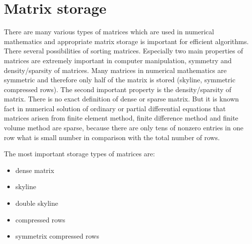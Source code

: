 \chapter{Matrix storage}
There are many various types of matrices which are used in numerical
mathematics and appropriate matrix storage is important for efficient
algorithms. There several possibilities of sorting matrices.
Especially two main properties of matrices are extremely important
in computer manipulation, symmetry and density/sparsity of matrices. Many
matrices in numerical mathematics are symmetric and therefore only
half of the matrix is stored (skyline, symmetric compressed rows).
The second important property is the density/sparsity of matrix. There is no
exact definition of dense or sparse matrix. But it is known fact in
numerical solution of ordinary or partial differential equations that
matrices arisen from finite element method, finite difference method and
finite volume method are sparse, because there are only tens of nonzero entries
in one row what is small number in comparison with the total number of rows.

\noindent
The most important storage types of matrices are:
\begin{itemize}
\item{dense matrix}
\item{skyline}
\item{double skyline}
\item{compressed rows}
\item{symmetrix compressed rows}
\end{itemize}

